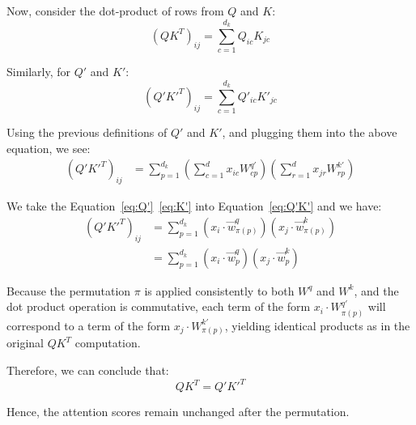 Now, consider the dot-product of rows from $Q$ and $K$:
\begin{equation}
    (QK^T)_{ij} = \sum_{c=1}^{d_k} Q_{ic} K_{jc} 
\end{equation}


Similarly, for $Q'$ and $K'$:
\begin{equation}
    (Q'K'^T)_{ij} = \sum_{c=1}^{d_k} Q'_{ic} K'_{jc}
\end{equation}


Using the previous definitions of $Q'$ and $K'$, and plugging them into the above equation, we see:
\begin{equation}
\begin{split}
\label{eq:Q'K'}
(Q'K'^T)_{ij} & = \sum_{p=1}^{d_k} \left( \sum_{c=1}^{d} x_{ic} W^{q'}_{cp} \right) \left( \sum_{r=1}^{d} x_{jr} W^{k'}_{rp} \right) 
\end{split}
\end{equation}

We take the Equation~\ref{eq:Q'}~\ref{eq:K'} into Equation~\ref{eq:Q'K'} and we have:
\begin{equation}\label{eq:Q'K'=QK}
\begin{split}
       (Q'K'^T)_{ij}  &= \sum_{p=1}^{d_k} \left( x_i \cdot \Vec{w}^q_{\pi(p)} \right) \left( x_j \cdot \Vec{w}^k_{\pi(p)} \right) 
       \\ &= \sum_{p=1}^{d_k} \left( x_i \cdot \Vec{w}^q_{p} \right) \left( x_j \cdot \Vec{w}^k_{p} \right) 
\end{split}
\end{equation}

Because the permutation $\pi$ is applied consistently to both $W^q$ and $W^k$, and the dot product operation is commutative, each term of the form $x_{i} \cdot W^{q'}_{\pi(p)}$ will correspond to a term of the form $x_{j} \cdot W^{k'}_{\pi(p)}$, yielding identical products as in the original $QK^T$ computation.

Therefore, we can conclude that:
\[ QK^T = Q'K'^T \]

Hence, the attention scores remain unchanged after the permutation.




